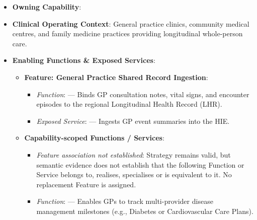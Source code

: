 \begin{itemize}

\item
\textbf{Owning Capability}: \texttt{}



\item
\textbf{Clinical Operating Context}: General practice clinics, community medical centres, and family medicine practices providing longitudinal whole-person care.



\item
\textbf{Enabling Functions \& Exposed Services}:


\begin{itemize}

\item
\textbf{Feature: General Practice Shared Record Ingestion}:


\begin{itemize}

\item
\emph{Function}: \texttt{} — Binds GP consultation notes, vital signs, and encounter episodes to the regional Longitudinal Health Record (LHR).



\item
\emph{Exposed Service}: \texttt{} — Ingests GP event summaries into the HIE.



\end{itemize}


\item
\textbf{Capability-scoped Functions /\allowbreak{} Services}:


\begin{itemize}

\item
\emph{Feature association not established}: Strategy \texttt{} remains valid, but semantic evidence does not establish that the following Function or Service belongs to, realises, specialises or is equivalent to it. No replacement Feature is assigned.



\item
\emph{Function}: \texttt{} — Enables GPs to track multi-provider disease management milestones (e.g., Diabetes or Cardiovascular Care Plans).




\end{itemize}
\end{itemize}
\end{itemize}
